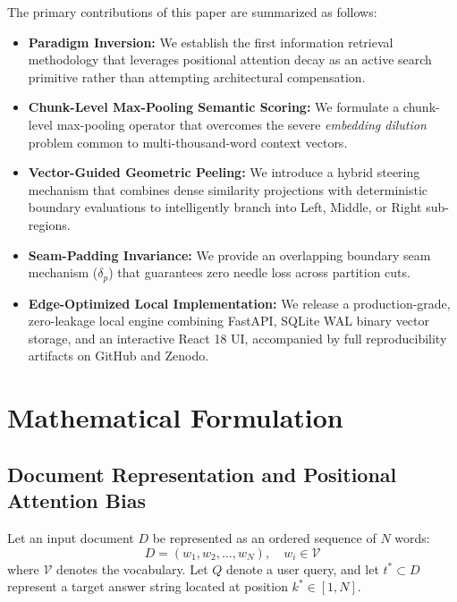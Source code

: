 The primary contributions of this paper are summarized as follows:
\begin{itemize}
    \item \textbf{Paradigm Inversion:} We establish the first information retrieval methodology that leverages positional attention decay as an active search primitive rather than attempting architectural compensation.
    \item \textbf{Chunk-Level Max-Pooling Semantic Scoring:} We formulate a chunk-level max-pooling operator that overcomes the severe \emph{embedding dilution} problem common to multi-thousand-word context vectors.
    \item \textbf{Vector-Guided Geometric Peeling:} We introduce a hybrid steering mechanism that combines dense similarity projections with deterministic boundary evaluations to intelligently branch into Left, Middle, or Right sub-regions.
    \item \textbf{Seam-Padding Invariance:} We provide an overlapping boundary seam mechanism ($\delta_p$) that guarantees zero needle loss across partition cuts.
    \item \textbf{Edge-Optimized Local Implementation:} We release a production-grade, zero-leakage local engine combining FastAPI, SQLite WAL binary vector storage, and an interactive React 18 UI, accompanied by full reproducibility artifacts on GitHub and Zenodo.
\end{itemize}

\section{Mathematical Formulation}
\label{sec:methodology}

\subsection{Document Representation and Positional Attention Bias}
Let an input document $D$ be represented as an ordered sequence of $N$ words:
\begin{equation}
    D = (w_1, w_2, \dots, w_N), \quad w_i \in \mathcal{V}
\end{equation}
where $\mathcal{V}$ denotes the vocabulary. Let $Q$ denote a user query, and let $t^* \subset D$ represent a target answer string located at position $k^* \in [1, N]$.

